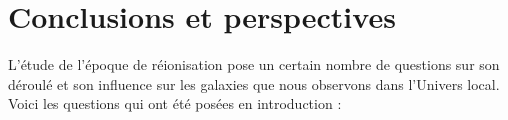 
\chapter{Conclusions et perspectives}


L'étude de l'époque de réionisation pose un certain nombre de questions sur son déroulé et son influence sur les galaxies que nous observons dans l'Univers local.
Voici les questions qui ont été posées en introduction :
%
%
%
%
%
%
%
%
%
%

